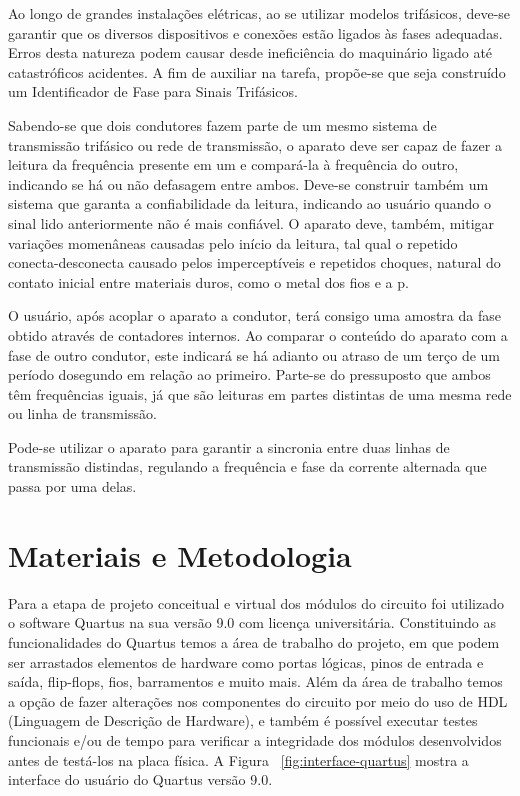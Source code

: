 \documentclass[12pt,a4paper,openany]{abntex2}
\begin{document}
Ao longo de grandes instalações elétricas, ao se utilizar modelos trifásicos, deve-se garantir que os diversos dispositivos e conexões estão ligados às fases adequadas. Erros desta natureza podem causar desde ineficiência do maquinário ligado até catastróficos acidentes. A fim de auxiliar na tarefa, propõe-se que seja construído um Identificador de Fase para Sinais Trifásicos.

Sabendo-se que dois condutores fazem parte de um mesmo sistema de transmissão trifásico ou rede de transmissão, o aparato deve ser capaz de fazer a leitura da frequência presente em um e compará-la à frequência do outro, indicando se há ou não defasagem entre ambos. Deve-se construir também um sistema que garanta a confiabilidade da leitura, indicando ao usuário quando o sinal lido anteriormente não é mais confiável. O aparato deve, também, mitigar variações momenâneas causadas pelo início da leitura, tal qual o repetido conecta-desconecta causado pelos imperceptíveis e repetidos choques, natural do contato inicial entre materiais duros, como o metal dos fios e a p.

O usuário, após acoplar o aparato a condutor, terá consigo uma amostra da fase obtido através de contadores internos. Ao comparar o conteúdo do aparato com a fase de outro condutor, este indicará se há adianto ou atraso de um terço de um período dosegundo em relação ao primeiro. Parte-se do pressuposto que ambos têm frequências iguais, já que são leituras em partes distintas de uma mesma rede ou linha de transmissão.

Pode-se utilizar o aparato para garantir a sincronia entre duas linhas de transmissão distindas, regulando a frequência e fase da corrente alternada que passa por uma delas.

\chapter{Materiais e Metodologia}

Para a etapa de projeto conceitual e virtual dos módulos do circuito foi utilizado
o software Quartus na sua versão 9.0 com licença universitária.
Constituindo as funcionalidades do Quartus temos a área de trabalho do projeto,
em que podem ser arrastados elementos de hardware como portas lógicas, pinos de
entrada e saída, flip-flops, fios, barramentos e muito mais.
Além da área de trabalho temos a opção de fazer alterações nos componentes do
circuito por meio do uso de HDL (Linguagem de Descrição de Hardware), e também é
possível executar testes funcionais e/ou de tempo para verificar a integridade dos
módulos desenvolvidos antes de testá-los na placa física.
A Figura ~\ref{fig:interface-quartus} mostra a interface do usuário do Quartus versão 9.0.
\end{document}
